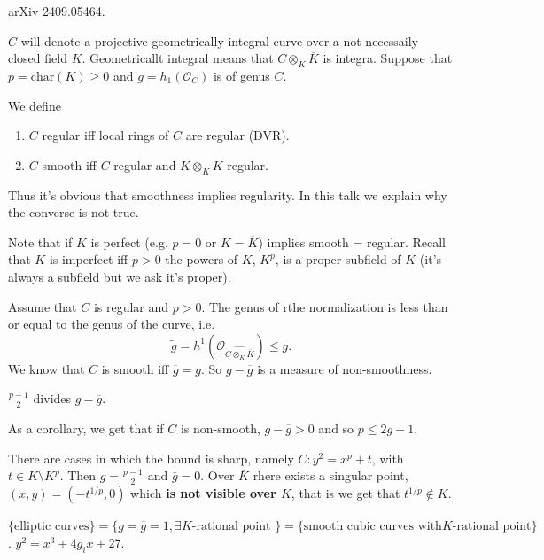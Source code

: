 \medskip\noindent
arXiv 2409.05464.

\medskip\noindent
$C$ will denote a projective geometrically
integral curve over
a not necessaily closed field $K$.
Geometricallt integral
means that $C \otimes_K \overline{K}$ is
integra.
Suppose that $p=\text{char}(K) \geq 0$
and $g=h_1(\mathcal{O}_C)$ is of genus $C$.

We define
\begin{enumerate}
\item $C$ regular iff local rings of $C$ are
regular (DVR).
\item $C$ smooth iff $C$ regular and $K
\otimes_K \overline{K}$ regular.
\end{enumerate}

\noindent
Thus it's obvious that smoothness implies
regularity.
In this talk we explain why the converse is
not true.

Note that if $K$ is perfect (e.g. $p=0$ or
$K=\overline{K}$) implies
 smooth = regular. Recall that $K$ is
 imperfect iff $p>0$
the powers of $K$, $K^p$, is a proper
subfield of $K$
(it's always a subfield but we ask it's
proper).

\medskip\noindent
Assume that $C$ is regular and $p>0$.
The genus of rthe normalization is less than
or equal to the genus of the curve,
i.e.
$$
\tilde{g}=h^1(\mathcal{O}_{\widehat{C
\otimes_K \overline{K}}})\leq g.
$$
We know that $C$ is smooth iff
$\overline{g}=g$.
So $g-\overline{g}$ is a measure of
non-smoothness.

\begin{theorem}[Tate]
\label{theorem-tate}
$\frac{p-1}{2}$ divides $g-\overline{g}$.
\end{theorem}

As a corollary, we get that if $C$ is
non-smooth,
$g-\overline{g}>0$ and so $p \leq  2g+1$.

\begin{example}
\label{example-attain}
There are cases in which the bound is sharp,
namely $C:y^2=x^p+t$, with $t \in K\setminus
K^p$.
Then $g=\frac{p-1}{2}$ and $\bar{g}=0$.
Over $\overline{K}$ rhere exists a singular
point,
$(x,y)=(-t^{1/p},0)$ which
{\bf is not visible over $K$}, that is we get
that
$t^{1/p}\not \in K$.
\end{example}

\begin{example}
\label{example-elliptic}
$\{\text{elliptic curves}\}=\{g =
\overline{g}=1,\text{$\exists K$-rational
point }\}=\{\text{smooth cubic curves with
$K$-rational point}\}$.
$y^2=x^3+4g_i x+27$.
\end{example}

